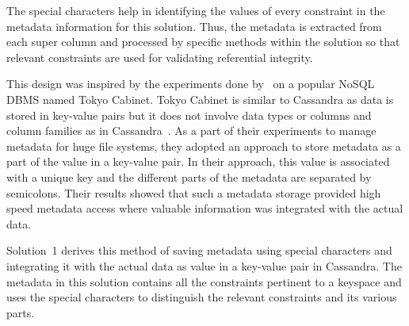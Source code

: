 % 

The special characters help in identifying the values of every constraint in the
metadata information for this solution. Thus, the metadata is extracted from
each super column and processed by specific methods within the solution so that
relevant constraints are used for validating referential integrity.  


This design was inspired by the experiments done by~\citet{Hackl} on a popular
\ac{NoSQL} \ac{DBMS} named Tokyo Cabinet.  Tokyo Cabinet is similar to Cassandra
as data is stored in key-value pairs but it does not involve data types or
columns and column families as in Cassandra~\citep{Hackl,tokyo}.
As a part of their experiments to manage metadata for huge file systems,  they
adopted an approach to store metadata  as a part of the value in a key-value
pair.  In their approach, this value  is associated with a
unique key and the different parts of the metadata are separated by semicolons.
Their results showed that such a metadata storage provided high speed metadata
access where valuable information was integrated with the actual data.

Solution~1 derives this method of saving
metadata using special characters and integrating it with the actual data as
value in a key-value pair in Cassandra.  The metadata in this solution 
contains all the constraints pertinent to a keyspace and uses
the special characters to distinguish the relevant constraints and its various
parts.




